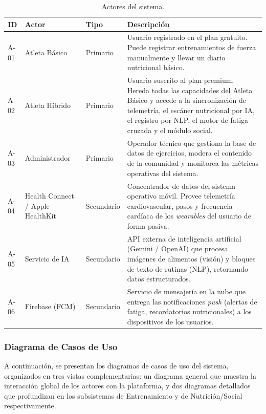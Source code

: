 \documentclass[12pt]{article}
\begin{document}
\begin{table}[h!]
    \centering
    \renewcommand{\arraystretch}{1.3}
    \begin{tabular}{|p{1cm}|p{3.5cm}|p{2cm}|p{8cm}|}
        \hline
        \rowcolor[HTML]{EFEFEF}
        \textbf{ID} & \textbf{Actor} & \textbf{Tipo} & \textbf{Descripción} \\ \hline
        A-01 & Atleta Básico & Primario & Usuario registrado en el plan gratuito. Puede registrar entrenamientos de fuerza manualmente y llevar un diario nutricional básico. \\ \hline
        A-02 & Atleta Híbrido & Primario & Usuario suscrito al plan premium. Hereda todas las capacidades del Atleta Básico y accede a la sincronización de telemetría, el escáner nutricional por IA, el registro por NLP, el motor de fatiga cruzada y el módulo social. \\ \hline
        A-03 & Administrador & Primario & Operador técnico que gestiona la base de datos de ejercicios, modera el contenido de la comunidad y monitorea las métricas operativas del sistema. \\ \hline
        A-04 & Health Connect / Apple HealthKit & Secundario & Concentrador de datos del sistema operativo móvil. Provee telemetría cardiovascular, pasos y frecuencia cardíaca de los \textit{wearables} del usuario de forma pasiva. \\ \hline
        A-05 & Servicio de IA & Secundario & API externa de inteligencia artificial (Gemini / OpenAI) que procesa imágenes de alimentos (visión) y bloques de texto de rutinas (NLP), retornando datos estructurados. \\ \hline
        A-06 & Firebase (FCM) & Secundario & Servicio de mensajería en la nube que entrega las notificaciones \textit{push} (alertas de fatiga, recordatorios nutricionales) a los dispositivos de los usuarios. \\ \hline
    \end{tabular}
    \caption{Actores del sistema.}
    \label{tab:actores}
\end{table}
\newpage
\subsubsection{Diagrama de Casos de Uso}
A continuación, se presentan los diagramas de casos de uso del sistema, organizados en tres vistas complementarias: un diagrama general que muestra la interacción global de los actores con la plataforma, y dos diagramas detallados que profundizan en los subsistemas de Entrenamiento y de Nutrición/Social respectivamente.
\end{document}

